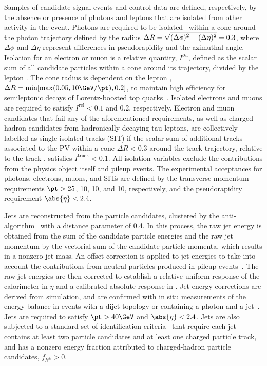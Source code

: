 Samples of candidate signal events and control data are defined,
respectively, by the absence or presence of photons and leptons that
are isolated from other activity in the event. Photons are required to
be isolated~\cite{Khachatryan:2015iwa} within a cone around the photon
trajectory defined by the radius ${\Delta}R =
\sqrt{\smash[b]{(\Delta\phi)^2 + (\Delta\eta)^2}} = 0.3$, where
$\Delta\phi$ and $\Delta\eta$ represent differences in pseudorapidity
and the azimuthal angle. Isolation for an electron or muon is a
relative quantity, $I^\text{rel}$, defined as the scalar \pt sum of
all candidate particles within a cone around its trajectory, divided
by the lepton \pt. The cone radius is dependent on the lepton \pt,
${\Delta}R = \min [ \max( 0.05, 10\GeV / \pt ), 0.2 ]$, to maintain
high efficiency for semileptonic decays of Lorentz-boosted top
quarks~\cite{Rehermann:2010vq}. Isolated electrons and muons are
required to satisfy $I^\text{rel} < 0.1$ and 0.2, respectively.
Electron and muon candidates that fail any of the aforementioned
requirements, as well as charged-hadron candidates from hadronically
decaying tau leptons, are collectively labelled as single isolated
tracks (SIT) if the scalar \pt sum of additional tracks associated to
the PV within a cone ${\Delta}R < 0.3$ around the track trajectory,
relative to the track \pt, satisfies $I^\text{track} < 0.1$. All
isolation variables exclude the contributions from the physics object
itself and pileup events. The experimental acceptances for photons,
electrons, muons, and SITs are defined by the transverse momentum
requirements $\pt > 25$, 10, 10, and 10\GeV, respectively, and the
pseudorapidity requirement $\abs{\eta} < 2.4$.

Jets are reconstructed from the particle candidates, clustered by the
anti-\kt algorithm~\cite{Cacciari:2008gp, Cacciari:2011ma} with a
distance parameter of 0.4. In this process, the raw jet energy is
obtained from the sum of the candidate particle energies and the raw
jet momentum by the vectorial sum of the candidate particle momenta,
which results in a nonzero jet mass. An offset correction is applied
to jet energies to take into account the contributions from neutral
particles produced in pileup events~\cite{Cacciari:2007fd,
  CMS-PAS-JME-14-001}. The raw jet energies are then corrected to
establish a relative uniform response of the calorimeter in $\eta$ and
a calibrated absolute response in \pt. Jet energy corrections are
derived from simulation, and are confirmed with in situ measurements
of the energy balance in events with a dijet topology or containing a
photon and a jet~\cite{Khachatryan:2016kdb}. Jets are required to
satisfy $\pt > 40\GeV$ and $\abs{\eta} < 2.4$. Jets are also subjected
to a standard set of identification criteria~\cite{2011JInst611002C}
that require each jet contains at least two particle candidates and at
least one charged particle track, and has a nonzero energy fraction
attributed to charged-hadron particle candidates, $f_{h^{\pm}} > 0$.

